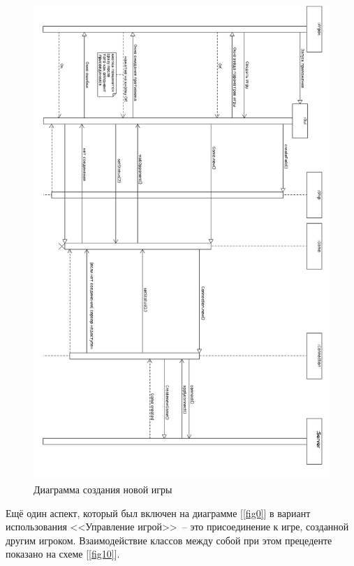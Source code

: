 \begin{figure}[pt]
\centering
\includegraphics[width=15cm]{images/CRG.png}
\caption{Диаграмма создания новой игры}
\label{fig9}
\end{figure}


Ещё один аспект, который был включен на диаграмме [\ref{fig0}] в вариант использования <<Управление игрой>>~-- это присоединение к игре, созданной другим игроком. Взаимодействие классов между собой при этом прецеденте показано на схеме [\ref{fig10}].

